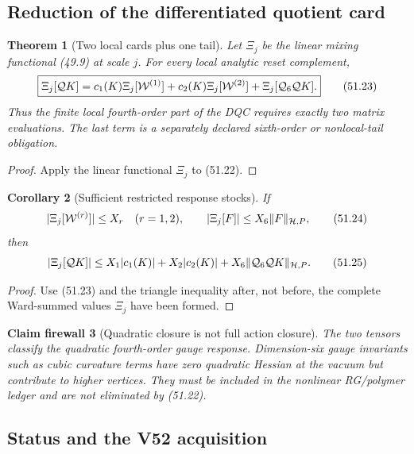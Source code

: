 \documentclass[11pt,oneside]{book}
\newtheorem{theorem}{Theorem}[chapter]
\newtheorem{corollary}[theorem]{Corollary}
\newtheorem{firewall}[theorem]{Claim firewall}
\theoremstyle{definition}
\theoremstyle{remark}
\begin{document}
\subsection{Reduction of the differentiated quotient card}

\begin{theorem}[Two local cards plus one tail]
\label{thm:e8v51-two-cards-tail}
Let \(\Xi_j\) be the linear mixing functional (49.9) at scale \(j\).
For every local analytic reset complement,
\[
\boxed{
 \Xi_j[{\cal Q}K]
 =c_1(K)\Xi_j[{\cal W}^{(1)}]
  +c_2(K)\Xi_j[{\cal W}^{(2)}]
  +\Xi_j[{\cal Q}_6{\cal Q}K].}                              \tag{51.23}
\]
Thus the finite local fourth-order part of the DQC requires exactly
two matrix evaluations.  The last term is a separately declared
sixth-order or nonlocal-tail obligation.
\end{theorem}

\begin{proof}
Apply the linear functional \(\Xi_j\) to (51.22).
\end{proof}

\begin{corollary}[Sufficient restricted response stocks]
\label{cor:e8v51-response-stocks}
If
\[
 |\Xi_j[{\cal W}^{(r)}]|\le X_r\quad(r=1,2),\qquad
 |\Xi_j[F]|\le X_6\|F\|_{{\cal H},P},                         \tag{51.24}
\]
then
\[
 |\Xi_j[{\cal Q}K]|
 \le X_1|c_1(K)|+X_2|c_2(K)|
     +X_6\|{\cal Q}_6{\cal Q}K\|_{{\cal H},P}.                \tag{51.25}
\]
\end{corollary}

\begin{proof}
Use (51.23) and the triangle inequality after, not before, the
complete Ward-summed values \(\Xi_j\) have been formed.
\end{proof}

\begin{firewall}[Quadratic closure is not full action closure]
\label{fire:e8v51-quadratic-only}
The two tensors classify the quadratic fourth-order gauge response.
Dimension-six gauge invariants such as cubic curvature terms have
zero quadratic Hessian at the vacuum but contribute to higher
vertices.  They must be included in the nonlinear RG/polymer
ledger and are not eliminated by (51.22).
\end{firewall}

\subsection{Status and the V52 acquisition}
\end{document}
